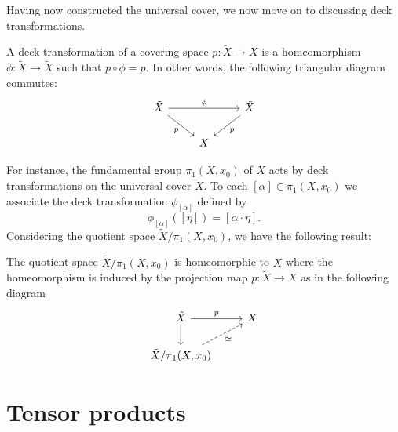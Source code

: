 \documentclass{report}
\begin{document}
Having now constructed the universal cover, we now move on to discussing deck transformations.
\begin{definition}
    A deck transformation of a covering space $p: \tilde X \to X$ is a homeomorphism $\phi: \tilde X \to \tilde X$ such that $p \circ \phi = p$.
    In other words, the following triangular diagram commutes:
    \[
    \begin{tikzcd}
        \tilde X \arrow[rr, "\phi"] \arrow[rd, "p"'] & & \tilde X \arrow[ld, "p"] \\
        & X &
    \end{tikzcd}
    \]
\end{definition}
For instance, the fundamental group $\pi_1(X, x_0)$ of $X$ acts by deck transformations on the universal cover $\tilde X$.
To each $[\alpha] \in \pi_1(X, x_0)$ we associate the deck transformation $\phi_{[\alpha]}$ defined by
\[
\phi_{[\alpha]}([\eta]) = [\alpha \cdot \eta].
\]
Considering the quotient space $\tilde X / \pi_1(X, x_0)$, we have the following result:
\begin{theorem}
    The quotient space $\tilde X / \pi_1(X, x_0)$ is homeomorphic to $X$ where the homeomorphism is induced by the projection map $p: \tilde X \to X$ as in the following diagram
    \[
    \begin{tikzcd}
        \tilde X \arrow[r, "p"] \arrow[d] & X \\
        \tilde X / \pi_1(X, x_0) \arrow[ur, "\simeq"', dashed]
    \end{tikzcd}
    \]
\end{theorem}


\chapter{Tensor products}
\end{document}
